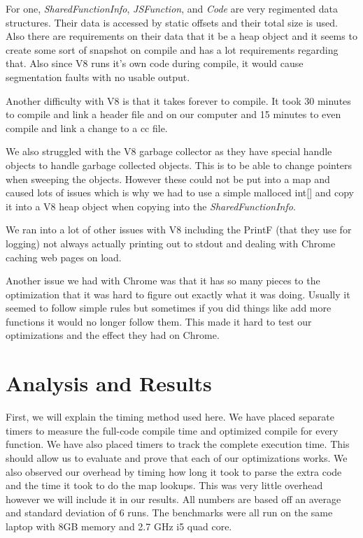 \documentclass[twocolumn,showpacs,%
  nofootinbib,aps,superscriptaddress,%
  eqsecnum,prd,notitlepage,showkeys,10pt]{revtex4-1}
\begin{document}
For one, \textit{SharedFunctionInfo}, \textit{JSFunction}, and \textit{Code} are very regimented data structures. Their data is  accessed by static offsets and their total size is used. Also there are requirements on their data that it be a heap object and it seems to create some sort of snapshot on compile and has a lot requirements regarding that. Also since V8 runs it's own code during compile, it would cause segmentation faults with no usable output.

Another difficulty with V8 is that it takes forever to compile. It took 30 minutes to compile and link a header file and on our computer and 15 minutes to even compile and link a change to a cc file.

We also struggled with the V8 garbage collector as they have special handle objects to handle garbage collected objects. This is to be able to change pointers when sweeping the objects. However these could not be put into a map and caused lots of issues which is why we had to use a simple malloced int[] and copy it into a V8 heap object when copying into the \textit{SharedFunctionInfo}. 

We ran into a lot of other issues with V8 including the PrintF (that they use for logging) not always actually printing out to stdout and dealing with Chrome caching web pages on load. 

Another issue we had with Chrome was that it has so many pieces to the optimization that it was hard to figure out exactly what it was doing. Usually it seemed to follow simple rules but sometimes if you did things like add more functions it would no longer follow them. This made it hard to test our optimizations and the effect they had on Chrome.

\section{Analysis and Results}
First, we will explain the timing method used here. We have placed separate timers to measure the full-code compile time and optimized compile for every function. We have also placed timers to track the complete execution time. This should allow us to evaluate and prove that each of our optimizations works. We also observed our overhead by timing how long it took to parse the extra code and the time it took to do the map lookups. This was very little overhead however we will include it in our results. All numbers are based off an average and standard deviation of 6 runs. The benchmarks were all run on the same laptop with 8GB memory and 2.7 GHz i5 quad core.
\end{document}
